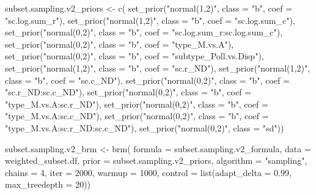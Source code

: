 \documentclass[11pt,]{article}
\newenvironment{Shaded}{}{}
\newcommand{\KeywordTok}[1]{\textcolor[rgb]{0.00,0.00,1.00}{#1}}
\newcommand{\DataTypeTok}[1]{#1}
\newcommand{\DecValTok}[1]{#1}
\newcommand{\FloatTok}[1]{#1}
\newcommand{\StringTok}[1]{\textcolor[rgb]{0.00,0.50,0.50}{#1}}
\newcommand{\NormalTok}[1]{#1}
\begin{document}
\begin{Shaded}
\begin{Highlighting}[]
\NormalTok{subset.sampling.v2_priors <-}\StringTok{ }\KeywordTok{c}\NormalTok{(}
  \KeywordTok{set_prior}\NormalTok{(}\StringTok{"normal(1,2)"}\NormalTok{, }\DataTypeTok{class =} \StringTok{"b"}\NormalTok{, }\DataTypeTok{coef =} \StringTok{"sc.log.sum_r"}\NormalTok{),}
  \KeywordTok{set_prior}\NormalTok{(}\StringTok{"normal(1,2)"}\NormalTok{, }\DataTypeTok{class =} \StringTok{"b"}\NormalTok{, }\DataTypeTok{coef =} \StringTok{"sc.log.sum_c"}\NormalTok{),}
  \KeywordTok{set_prior}\NormalTok{(}\StringTok{"normal(0,2)"}\NormalTok{, }\DataTypeTok{class =} \StringTok{"b"}\NormalTok{, }\DataTypeTok{coef =} \StringTok{"sc.log.sum_r:sc.log.sum_c"}\NormalTok{),}
  \KeywordTok{set_prior}\NormalTok{(}\StringTok{"normal(0,2)"}\NormalTok{, }\DataTypeTok{class =} \StringTok{"b"}\NormalTok{, }\DataTypeTok{coef =} \StringTok{"type_M.vs.A"}\NormalTok{),}
  \KeywordTok{set_prior}\NormalTok{(}\StringTok{"normal(0,2)"}\NormalTok{, }\DataTypeTok{class =} \StringTok{"b"}\NormalTok{, }\DataTypeTok{coef =} \StringTok{"subtype_Poll.vs.Disp"}\NormalTok{),}
  \KeywordTok{set_prior}\NormalTok{(}\StringTok{"normal(1,2)"}\NormalTok{, }\DataTypeTok{class =} \StringTok{"b"}\NormalTok{, }\DataTypeTok{coef =} \StringTok{"sc.r_ND"}\NormalTok{),}
  \KeywordTok{set_prior}\NormalTok{(}\StringTok{"normal(1,2)"}\NormalTok{, }\DataTypeTok{class =} \StringTok{"b"}\NormalTok{, }\DataTypeTok{coef =} \StringTok{"sc.c_ND"}\NormalTok{),}
  \KeywordTok{set_prior}\NormalTok{(}\StringTok{"normal(0,2)"}\NormalTok{, }\DataTypeTok{class =} \StringTok{"b"}\NormalTok{, }\DataTypeTok{coef =} \StringTok{"sc.r_ND:sc.c_ND"}\NormalTok{),}
  \KeywordTok{set_prior}\NormalTok{(}\StringTok{"normal(0,2)"}\NormalTok{, }\DataTypeTok{class =} \StringTok{"b"}\NormalTok{, }\DataTypeTok{coef =} \StringTok{"type_M.vs.A:sc.r_ND"}\NormalTok{),}
  \KeywordTok{set_prior}\NormalTok{(}\StringTok{"normal(0,2)"}\NormalTok{, }\DataTypeTok{class =} \StringTok{"b"}\NormalTok{, }\DataTypeTok{coef =} \StringTok{"type_M.vs.A:sc.c_ND"}\NormalTok{),}
  \KeywordTok{set_prior}\NormalTok{(}\StringTok{"normal(0,2)"}\NormalTok{, }\DataTypeTok{class =} \StringTok{"b"}\NormalTok{, }\DataTypeTok{coef =} \StringTok{"type_M.vs.A:sc.r_ND:sc.c_ND"}\NormalTok{),}
  \KeywordTok{set_prior}\NormalTok{(}\StringTok{"normal(0,2)"}\NormalTok{, }\DataTypeTok{class =} \StringTok{"sd"}\NormalTok{))}

\NormalTok{subset.sampling.v2_brm <-}\StringTok{ }\KeywordTok{brm}\NormalTok{(}
  \DataTypeTok{formula =}\NormalTok{ subset.sampling.v2_formula, }\DataTypeTok{data =}\NormalTok{ weighted_subset.df, }
  \DataTypeTok{prior =}\NormalTok{ subset.sampling.v2_priors, }\DataTypeTok{algorithm =} \StringTok{"sampling"}\NormalTok{, }
  \DataTypeTok{chains =} \DecValTok{4}\NormalTok{, }\DataTypeTok{iter =} \DecValTok{2000}\NormalTok{, }\DataTypeTok{warmup =} \DecValTok{1000}\NormalTok{, }
  \DataTypeTok{control =} \KeywordTok{list}\NormalTok{(}\DataTypeTok{adapt_delta =} \FloatTok{0.99}\NormalTok{, }\DataTypeTok{max_treedepth =} \DecValTok{20}\NormalTok{))}
\end{Highlighting}
\end{Shaded}
\end{document}
